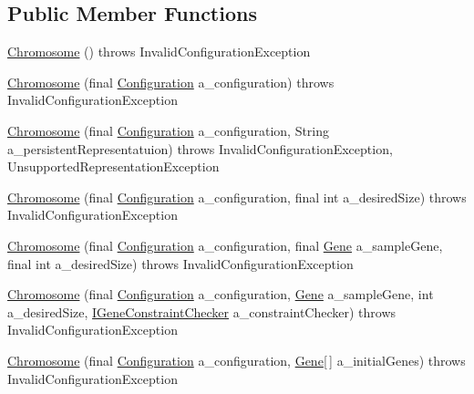 \subsection*{Public Member Functions}
\begin{DoxyCompactItemize}
\item 
\hyperlink{classorg_1_1jgap_1_1_chromosome_a14c96eb2e38fe28b05526633e4677ec6}{Chromosome} ()  throws Invalid\-Configuration\-Exception 
\item 
\hyperlink{classorg_1_1jgap_1_1_chromosome_a62510703fe45c4a8c453801eaa148bb7}{Chromosome} (final \hyperlink{classorg_1_1jgap_1_1_configuration}{Configuration} a\-\_\-configuration)  throws Invalid\-Configuration\-Exception 
\item 
\hyperlink{classorg_1_1jgap_1_1_chromosome_a7290755db8269b79ebdb00b0cd0a9935}{Chromosome} (final \hyperlink{classorg_1_1jgap_1_1_configuration}{Configuration} a\-\_\-configuration, String a\-\_\-persistent\-Representatuion)  throws Invalid\-Configuration\-Exception, Unsupported\-Representation\-Exception 
\item 
\hyperlink{classorg_1_1jgap_1_1_chromosome_a6e5e72f40a4e2f2b7b72ce6678235f40}{Chromosome} (final \hyperlink{classorg_1_1jgap_1_1_configuration}{Configuration} a\-\_\-configuration, final int a\-\_\-desired\-Size)  throws Invalid\-Configuration\-Exception 
\item 
\hyperlink{classorg_1_1jgap_1_1_chromosome_a2872ac725d9182b66352057850f89176}{Chromosome} (final \hyperlink{classorg_1_1jgap_1_1_configuration}{Configuration} a\-\_\-configuration, final \hyperlink{interfaceorg_1_1jgap_1_1_gene}{Gene} a\-\_\-sample\-Gene, final int a\-\_\-desired\-Size)  throws Invalid\-Configuration\-Exception 
\item 
\hyperlink{classorg_1_1jgap_1_1_chromosome_a4f6e9e1bf122719fe420c3bc034fb4b3}{Chromosome} (final \hyperlink{classorg_1_1jgap_1_1_configuration}{Configuration} a\-\_\-configuration, \hyperlink{interfaceorg_1_1jgap_1_1_gene}{Gene} a\-\_\-sample\-Gene, int a\-\_\-desired\-Size, \hyperlink{interfaceorg_1_1jgap_1_1_i_gene_constraint_checker}{I\-Gene\-Constraint\-Checker} a\-\_\-constraint\-Checker)  throws Invalid\-Configuration\-Exception 
\item 
\hyperlink{classorg_1_1jgap_1_1_chromosome_a9156d92adcdf9c918bb37c771805b497}{Chromosome} (final \hyperlink{classorg_1_1jgap_1_1_configuration}{Configuration} a\-\_\-configuration, \hyperlink{interfaceorg_1_1jgap_1_1_gene}{Gene}\mbox{[}$\,$\mbox{]} a\-\_\-initial\-Genes)  throws Invalid\-Configuration\-Exception 

\end{DoxyCompactItemize}

